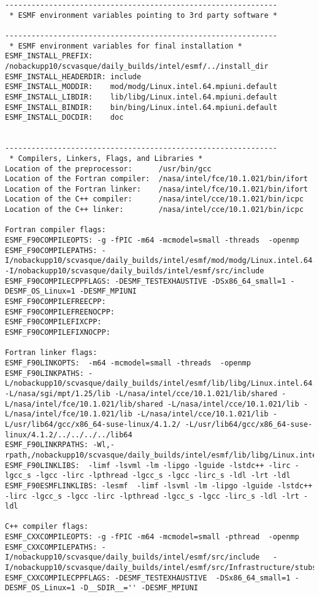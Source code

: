 \begin{verbatim}
--------------------------------------------------------------
 * ESMF environment variables pointing to 3rd party software *
 
--------------------------------------------------------------
 * ESMF environment variables for final installation *
ESMF_INSTALL_PREFIX:    /nobackupp10/scvasque/daily_builds/intel/esmf/../install_dir
ESMF_INSTALL_HEADERDIR: include
ESMF_INSTALL_MODDIR:    mod/modg/Linux.intel.64.mpiuni.default
ESMF_INSTALL_LIBDIR:    lib/libg/Linux.intel.64.mpiuni.default
ESMF_INSTALL_BINDIR:    bin/bing/Linux.intel.64.mpiuni.default
ESMF_INSTALL_DOCDIR:    doc
 
 
--------------------------------------------------------------
 * Compilers, Linkers, Flags, and Libraries *
Location of the preprocessor:      /usr/bin/gcc
Location of the Fortran compiler:  /nasa/intel/fce/10.1.021/bin/ifort
Location of the Fortran linker:    /nasa/intel/fce/10.1.021/bin/ifort
Location of the C++ compiler:      /nasa/intel/cce/10.1.021/bin/icpc
Location of the C++ linker:        /nasa/intel/cce/10.1.021/bin/icpc

Fortran compiler flags:
ESMF_F90COMPILEOPTS: -g -fPIC -m64 -mcmodel=small -threads  -openmp
ESMF_F90COMPILEPATHS: -I/nobackupp10/scvasque/daily_builds/intel/esmf/mod/modg/Linux.intel.64.mpiuni.default -I/nobackupp10/scvasque/daily_builds/intel/esmf/src/include 
ESMF_F90COMPILECPPFLAGS: -DESMF_TESTEXHAUSTIVE -DSx86_64_small=1 -DESMF_OS_Linux=1 -DESMF_MPIUNI
ESMF_F90COMPILEFREECPP: 
ESMF_F90COMPILEFREENOCPP: 
ESMF_F90COMPILEFIXCPP: 
ESMF_F90COMPILEFIXNOCPP: 

Fortran linker flags:
ESMF_F90LINKOPTS:  -m64 -mcmodel=small -threads  -openmp
ESMF_F90LINKPATHS: -L/nobackupp10/scvasque/daily_builds/intel/esmf/lib/libg/Linux.intel.64.mpiuni.default  -L/nasa/sgi/mpt/1.25/lib -L/nasa/intel/cce/10.1.021/lib/shared -L/nasa/intel/fce/10.1.021/lib/shared -L/nasa/intel/cce/10.1.021/lib -L/nasa/intel/fce/10.1.021/lib -L/nasa/intel/cce/10.1.021/lib -L/usr/lib64/gcc/x86_64-suse-linux/4.1.2/ -L/usr/lib64/gcc/x86_64-suse-linux/4.1.2/../../../../lib64
ESMF_F90LINKRPATHS: -Wl,-rpath,/nobackupp10/scvasque/daily_builds/intel/esmf/lib/libg/Linux.intel.64.mpiuni.default
ESMF_F90LINKLIBS:  -limf -lsvml -lm -lipgo -lguide -lstdc++ -lirc -lgcc_s -lgcc -lirc -lpthread -lgcc_s -lgcc -lirc_s -ldl -lrt -ldl
ESMF_F90ESMFLINKLIBS: -lesmf  -limf -lsvml -lm -lipgo -lguide -lstdc++ -lirc -lgcc_s -lgcc -lirc -lpthread -lgcc_s -lgcc -lirc_s -ldl -lrt -ldl

C++ compiler flags:
ESMF_CXXCOMPILEOPTS: -g -fPIC -m64 -mcmodel=small -pthread  -openmp
ESMF_CXXCOMPILEPATHS: -I/nobackupp10/scvasque/daily_builds/intel/esmf/src/include   -I/nobackupp10/scvasque/daily_builds/intel/esmf/src/Infrastructure/stubs/mpiuni
ESMF_CXXCOMPILECPPFLAGS: -DESMF_TESTEXHAUSTIVE  -DSx86_64_small=1 -DESMF_OS_Linux=1 -D__SDIR__='' -DESMF_MPIUNI


\end{verbatim}
